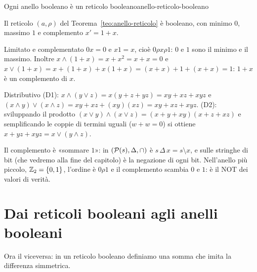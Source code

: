 \begin{concetto}
\begin{Proposizione}{Ogni anello booleano è un reticolo booleano}{anello-reticolo-booleano}
    \begin{prerequisiti}
    \end{prerequisiti}
    Il reticolo $(a, \rho)$ del Teorema~\ref{teo:anello-reticolo} è booleano, con minimo $0$, massimo $1$ e complemento $x' = 1 + x$.
\end{Proposizione}
\begin{dimostrazione}
    \begin{caso}{Limitato e complementato}
        $0x = 0$ e $x1 = x$, cioè $0 \rho x \rho 1$: $0$ e $1$ sono il minimo e il massimo. Inoltre $x \wedge (1 + x) = x + x^2 = x + x = 0$ e
        $x \vee (1 + x) = x + (1 + x) + x(1 + x) = (x + x) + 1 + (x + x) = 1$: $1 + x$ è un complemento di $x$.
    \end{caso}
    \begin{caso}{Distributivo}
        (D1): $x \wedge (y \vee z) = x(y + z + yz) = xy + xz + xyz$ e $(x \wedge y) \vee (x \wedge z) = xy + xz + (xy)(xz) = xy + xz + xyz$. (D2): sviluppando il prodotto
        $(x \vee y) \wedge (x \vee z) = (x + y + xy)(x + z + xz)$ e semplificando le coppie di termini uguali ($w + w = 0$) si ottiene $x + yz + xyz = x \vee (y \wedge z)$.
    \end{caso}
\end{dimostrazione}
\end{concetto}

\begin{spiegazione}
    Il complemento è «sommare $1$»: in $(\mathcal{P}(s), \Delta, \cap)$ è $s \,\Delta\, x = s \setminus x$, e sulle stringhe di bit (che vedremo alla fine del
    capitolo) è la negazione di ogni bit. Nell'anello più piccolo, $\mathbb{Z}_2 = \{0, 1\}$, l'ordine è $0 \rho 1$ e il complemento scambia $0$ e $1$: è il
    NOT dei valori di verità.
\end{spiegazione}

\newpage
\section{Dai reticoli booleani agli anelli booleani}\label{sec:reticoli-anelli}

Ora il viceversa: in un reticolo booleano definiamo una somma che imita la differenza simmetrica.


